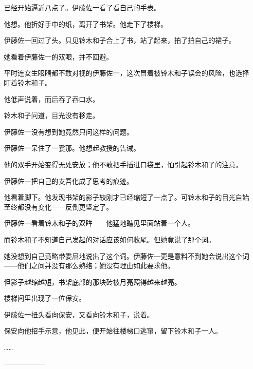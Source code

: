 已经开始逼近八点了。伊藤佐一看了看自己的手表。

他想。他折好手中的纸，离开了书架。他走下了楼梯。


伊藤佐一回过了头。只见铃木和子合上了书，站了起来，拍了拍自己的裙子。

她看着伊藤佐一的双眼，并不回避。

平时连女生眼睛都不敢对视的伊藤佐一，这次冒着被铃木和子误会的风险，也选择盯着铃木和子。

他低声说着，而后吞了吞口水。

铃木和子问道，目光没有移走。

伊藤佐一没有想到她竟然只问这样的问题。



伊藤佐一呆住了一霎那。他想起教授的告诫。


他的双手开始变得无处安放；他不敢把手插进口袋里，怕引起铃木和子的注意。

伊藤佐一把自己的支吾化成了思考的痕迹。

他看着脚下。他发现书架的影子较刚才已经缩短了一点了。可铃木和子的目光自始至终都没有变化——反倒更坚定了。

伊藤佐一看着铃木和子的双眸——他猛地瞧见里面站着一个人。

而铃木和子不知道自己发起的对话应该如何收尾。但她竟说了那个词。


她没想到自己竟略带委屈地说出了这个词。伊藤佐一更是意料不到她会说出这个词——他们之间并没有那么熟络；她没有理由如此要求他。

但影子越缩越短，书架底部的那块砖被月亮照得越来越亮。


楼梯间里出现了一位保安。


伊藤佐一扭头看向保安，又看向铃木和子，说着。

保安向他招手示意，他见此，便开始往楼梯口逃窜，留下铃木和子一人。

……

\begin{center}
——————
\end{center}

